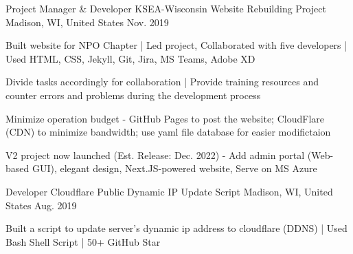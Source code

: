 \begin{cventries}
  \cventry
  {Project Manager \& Developer} %
  {KSEA-Wisconsin Website Rebuilding Project} %
  {Madison, WI, United States} %
  {Nov. 2019} %
  {
    \begin{cvitems} %
      \item {Built website for NPO Chapter | Led project, Collaborated with five developers | Used HTML, CSS, Jekyll, Git, Jira, MS Teams, Adobe XD}
      \item {Divide tasks accordingly for collaboration | Provide training resources and counter errors and problems during the development process}
      \item {Minimize operation budget - GitHub Pages to post the website; CloudFlare (CDN) to minimize bandwidth; use yaml file database for easier modifictaion}
      \item {V2 project now launched (Est. Release: Dec. 2022) - Add admin portal (Web-based GUI), elegant design, Next.JS-powered website, Serve on MS Azure}
    \end{cvitems}
  }

  \cventry
  {Developer} %
  {Cloudflare Public Dynamic IP Update Script} %
  {Madison, WI, United States} %
  {Aug. 2019} %
  {
    \begin{cvitems} %
      \item {Built a script to update server's dynamic ip address to cloudflare (DDNS) | Used Bash Shell Script | 50+ GitHub Star}
    \end{cvitems}
  }

\end{cventries}
